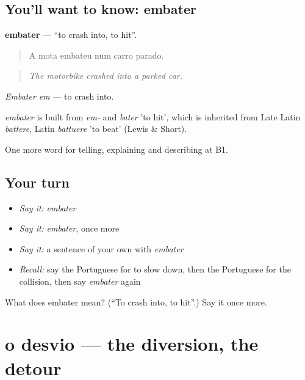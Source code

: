 \subsection*{You'll want to know: embater}
\textbf{embater} — \textquotedblleft{}to crash into, to hit\textquotedblright{}.

\begin{quote}
A mota embateu num carro parado.
\end{quote}

\begin{quote}
\emph{The motorbike crashed into a parked car.}
\end{quote}

\emph{Embater em} — to crash into.

\begin{cousinweb}
\emph{embater} is built from \emph{em-} and \emph{bater} 'to hit', which is inherited from Late Latin \emph{battere}, Latin \emph{battuere} 'to beat' (Lewis \& Short).
\end{cousinweb}

\begin{grammarlens}[title={What you've built}]
One more word for telling, explaining and describing at B1.
\end{grammarlens}

\subsection*{Your turn}
\begin{itemize}
\raggedright
  \item \emph{Say it:} \emph{embater}
  \item \emph{Say it:} \emph{embater}, once more
  \item \emph{Say it:} a sentence of your own with \emph{embater}
  \item \emph{Recall:} say the Portuguese for to slow down, then the Portuguese for the collision, then say \emph{embater} again
\end{itemize}

\begin{tcolorbox}[breakable,colback=teal!4,colframe=teal!35!black,title={Before you move on}]
What does embater mean? (\textquotedblleft{}To crash into, to hit\textquotedblright{}.) Say it once more.
\end{tcolorbox}
\section[o desvio]{o desvio — the diversion, the detour}

